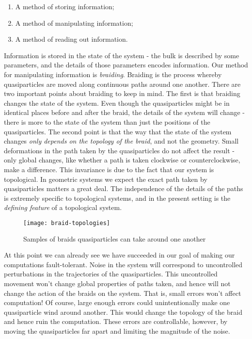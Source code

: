 \begin{enumerate}
\item A method of storing information;
\item A method of manipulating information;
\item A method of reading out information.
\end{enumerate}

Information is stored in the state of the system - the bulk is described by some parameters, and the details of those parameters encodes information. Our method for manipulating information is {\em braiding}. Braiding is the process whereby quasiparticles are moved along continuous paths around one another. There are two important points about braiding to keep in mind. The first is that braiding changes the state of the system. Even though the quasiparticles might be in identical places before and after the braid, the details of the system will change - there is more to the state of the system than just the positions of the quasiparticles. The second point is that the way that the state of the system changes {\em only depends on the topology of the braid}, and not the geometry. Small deformations in the path taken by the quasiparticles do not affect the result - only global changes, like whether a path is taken clockwise or counterclockwise, make a difference. This invariance is due to the fact that our system is topological. In geometric systems we expect the exact path taken by quasiparticles matters a great deal. The independence of the details of the paths is extremely specific to topological systems, and in the present setting is the {\em defining feature} of a topological system.

\begin{figure}
\begin{center}
\texttt{[image: braid-topologies]}
\caption{Samples of braids quasiparticles can take around one another}
\label{braid-topologies}
\end{center}
\end{figure}

At this point we can already see we have succeeded in our goal of making our computations fault-tolerant. Noise in the system will correspond to uncontrolled perturbations in the trajectories of the quasiparticles. This uncontrolled movement won’t change global properties of paths taken, and hence will not change the action of the braids on the system. That is, small errors won't affect computation! Of course, large enough errors could unintentionally make one quasiparticle wind around another. This would change the topology of the braid and hence ruin the computation. These errors are controllable, however, by moving the quasiparticles far apart and limiting the magnitude of the noise.

